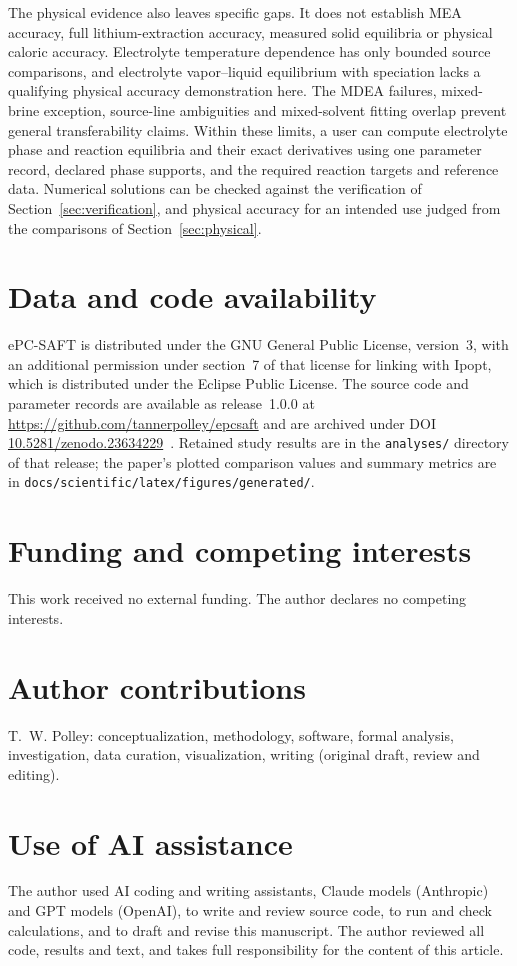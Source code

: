 The physical evidence also leaves specific gaps.
It does not establish MEA accuracy, full lithium-extraction accuracy, measured solid equilibria or physical caloric accuracy.
Electrolyte temperature dependence has only bounded source comparisons, and electrolyte vapor--liquid equilibrium with speciation lacks a qualifying physical accuracy demonstration here.
The MDEA failures, mixed-brine exception, source-line ambiguities and mixed-solvent fitting overlap prevent general transferability claims.
Within these limits, a user can compute electrolyte phase and reaction equilibria and their exact derivatives using one parameter record, declared phase supports, and the required reaction targets and reference data.
Numerical solutions can be checked against the verification of Section~\ref{sec:verification}, and physical accuracy for an intended use judged from the comparisons of Section~\ref{sec:physical}.

\section*{Data and code availability}
ePC-SAFT is distributed under the GNU General Public License, version~3, with an additional permission under section~7 of that license for linking with Ipopt, which is distributed under the Eclipse Public License.
The source code and parameter records are available as release~1.0.0 at \url{https://github.com/tannerpolley/epcsaft} and are archived under DOI \href{https://doi.org/10.5281/zenodo.23634229}{10.5281/zenodo.23634229}~\citep{polley_2026_23634229}.
Retained study results are in the \texttt{analyses/} directory of that release; the paper's plotted comparison values and summary metrics are in \texttt{docs/scientific/latex/figures/generated/}.

\section*{Funding and competing interests}
This work received no external funding.
The author declares no competing interests.

\section*{Author contributions}
T.~W. Polley: conceptualization, methodology, software, formal analysis, investigation, data curation, visualization, writing (original draft, review and editing).

\section*{Use of AI assistance}
The author used AI coding and writing assistants, Claude models (Anthropic) and GPT models (OpenAI), to write and review source code, to run and check calculations, and to draft and revise this manuscript.
The author reviewed all code, results and text, and takes full responsibility for the content of this article.
